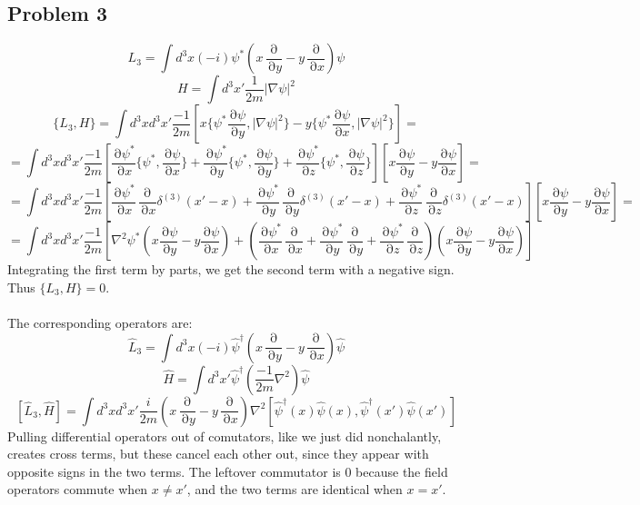 \documentclass[12 pt]{article}
\DeclareMathOperator {\p} {\partial}
\begin{document}
\subsection*{Problem 3}
\[      L_3 =  \int d^3x  (-i) \psi^* \left(   x \frac{\p}{\p y} - y \frac{\p}{\p x}  \right) \psi  \]
\[      H = \int d^3 x' \frac{1}{2m} \left| \nabla \psi \right|^2              \]
\[      \{L_3, H\} = \int d^3 x d^3 x' \frac{-1}{2m} \left[  x\{ \psi^* \frac{\p \psi}{\p y} , | \nabla \psi|^2\}  -  y \{ \psi^* \frac{\p \psi}{\p x} , |\nabla \psi|^2     \}   \right]    =    \]
\[       =    \int d^3 x d^3 x' \frac{-1}{2m}  \left[   \frac{\p \psi^*}{\p x} \{  \psi^* , \frac{\p \psi}{\p x} \}+  \frac{\p \psi^*}{\p y} \{  \psi^* , \frac{\p \psi}{\p y} \} +  \frac{\p \psi^*}{\p z} \{  \psi^* , \frac{\p \psi}{\p z} \}        \right]  \left[   x  \frac{\p \psi}{\p y} - y  \frac{\p \psi}{\p x}  \right]  =   \]
\[       =    \int d^3 x d^3 x' \frac{-1}{2m}  \left[   \frac{\p \psi^*}{\p x} \frac{\p}{\p x} \delta^{(3)} (x' - x) +  \frac{\p \psi^*}{\p y} \frac{\p}{\p y} \delta^{(3)} (x' - x)  +  \frac{\p \psi^*}{\p z} \frac{\p}{\p z} \delta^{(3)} (x' - x)         \right]  \left[   x  \frac{\p \psi}{\p y} - y  \frac{\p \psi}{\p x}  \right]  =   \]
\[  =     \int d^3 x d^3 x' \frac{-1}{2m}  \left[  \nabla^2 \psi^* (x\frac{\p \psi}{\p y} - y \frac{\p \psi}{\p x} )   + (\frac{\p \psi^*}{\p x} \frac{\p}{\p x} + \frac{\p \psi^*}{\p y} \frac{\p}{\p y} + \frac{\p \psi^*}{\p z} \frac{\p}{\p z} ) (x\frac{\p \psi}{\p y} - y \frac{\p \psi}{\p x})   \right]            \]
Integrating the first term by parts, we get the second term with a negative sign. Thus $ \{L_3, H\} = 0$.
\\
\\
The corresponding operators are:
\[       \hat L_3 = \int d^3 x (-i) \hat \psi^{\dagger} \left( x \frac{\p}{\p y} - y \frac{\p}{\p x}    \right)  \hat \psi      \]
\[      \hat H = \int d^3 x'  \hat \psi^{\dagger} \left( \frac{-1}{2m} \nabla^2  \right) \hat \psi              \]
\[    [\hat L_3 , \hat H]  =   \int d^3 x d^3 x'   \frac{i}{2m} \left(  x\frac{\p}{\p y} - y \frac{\p}{\p x}  \right)  \nabla^2 [\hat \psi^{\dagger} (x) \hat \psi (x) , \hat \psi^{\dagger} (x') \hat \psi (x') ]      \]
Pulling differential operators out of comutators, like we just did nonchalantly, creates cross terms, but these cancel each other out, since they appear with opposite signs in the two terms. The leftover commutator is 0 because the field operators commute when $x\neq x'$, and the two terms are identical when $x = x'$.
\\
\end{document}
